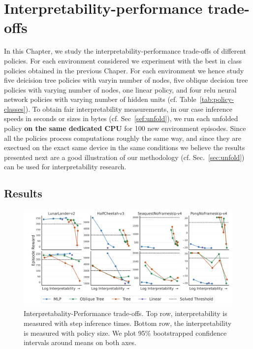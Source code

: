 \chapter{Interpretability-performance trade-offs}\label{sec:exps2}
In this Chapter, we study the interpretability-performance trade-offs of different policies.
For each environment considered we experiment with the best in class policies obtained in the previous Chaper.  
For each environment we hence study five deicision tree policies with varyin number of nodes, five oblique decision tree policies with varying number of nodes, one linear policy, and four relu neural network policies with varying number of hidden units (cf. Table~\ref{tab:policy-classes}).
To obtain fair interpretability measurements, in our case inference speeds in seconds or sizes in bytes (cf. Sec~\ref{sef:unfold}), we run each unfolded policy \textbf{on the same dedicated CPU} for 100 new environment episodes.
Since all the policies process computations roughly the same way, and since they are exectued on the exact same device in the same conditions we believe the results presented next are a good illustration of our methodology (cf. Sec.~\ref{sec:unfold}) 
can be used for interpretability research.

\section{Results}
\begin{figure}
    \centering
    \includegraphics[trim={1.4cm 0 0 0},clip,width=1\textwidth]{images/images_part3/trade_off_select_combine_one_plot.pdf}
    \caption{Interpretabality-Performance trade-offs. Top row, interpretability is measured with step inference times. Bottom row, the interpretability is measured with policy size. We plot 95\% bootstrapped confidence intervals around means on both axes.}
    \label{fig:trade-off-summary}
\end{figure}

